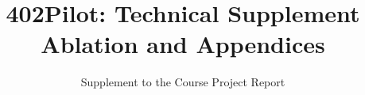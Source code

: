\documentclass[sigconf, nonacm]{acmart}
\theoremstyle{remark}
\begin{document}
\title[402Pilot Technical Supplement]{\texorpdfstring{402Pilot: Technical Supplement\\Ablation and Appendices}{402Pilot: Technical Supplement: Ablation and Appendices}}
\subtitle{Supplement to the Course Project Report}

\maketitle

\appendix








\end{document}
